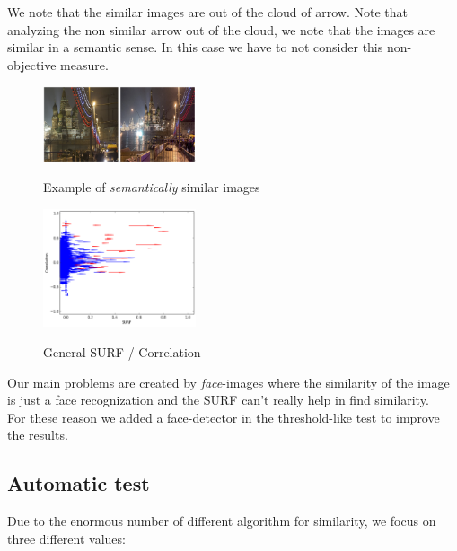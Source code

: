 \documentclass[10pt, journal,twocolumn]{IEEEtran}
\begin{document}
We note that the similar images are out of the cloud of arrow. Note that analyzing the non similar arrow out of the cloud, we note that the images are similar in a semantic sense. In this case we have to not consider this non-objective measure.

\begin{figure}[!ht]
  \begin{center}
  \includegraphics[keepaspectratio,width=0.4\textwidth]{4sim}\\
  \caption{Example of \emph{semantically} similar images}\label{4simimm}
  \end{center}
\end{figure}

\begin{figure}[!ht]
  \begin{center}
  \includegraphics[keepaspectratio,width=0.4\textwidth]{1234}\\
  \caption{General SURF / Correlation}\label{newssurfcorrgen}
  \end{center}
\end{figure}

Our main problems are created by \emph{face}-images where the similarity of the image is just a face recognization and the SURF can't really help in find similarity.\\
For these reason we added a face-detector in the threshold-like test to improve the results.


\subsection{Automatic test}

Due to the enormous number of different algorithm for similarity, we focus on three different values:
\end{document}
